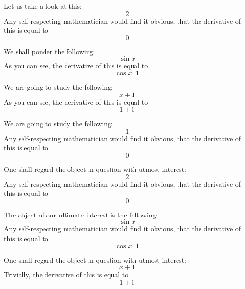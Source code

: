 \documentclass{article}
\begin{document}
Let us take a look at this:
\begin{equation}
2 
\end{equation}
Any self-respecting mathematician would find it obvious, that the derivative of this is equal to
\begin{equation}
0 
\end{equation}

We shall ponder the following:
\begin{equation}
\sin x 
\end{equation}
As you can see, the derivative of this is equal to
\begin{equation}
\cos x \cdot 1 
\end{equation}

We are going to study the following:
\begin{equation}
x + 1 
\end{equation}
As you can see, the derivative of this is equal to
\begin{equation}
1 + 0 
\end{equation}

We are going to study the following:
\begin{equation}
1 
\end{equation}
Any self-respecting mathematician would find it obvious, that the derivative of this is equal to
\begin{equation}
0 
\end{equation}

One shall regard the object in question with utmost interest:
\begin{equation}
2 
\end{equation}
Any self-respecting mathematician would find it obvious, that the derivative of this is equal to
\begin{equation}
0 
\end{equation}

The object of our ultimate interest is the following:
\begin{equation}
\sin x 
\end{equation}
Any self-respecting mathematician would find it obvious, that the derivative of this is equal to
\begin{equation}
\cos x \cdot 1 
\end{equation}

One shall regard the object in question with utmost interest:
\begin{equation}
x + 1 
\end{equation}
Trivially, the derivative of this is equal to
\begin{equation}
1 + 0 
\end{equation}
\end{document}
